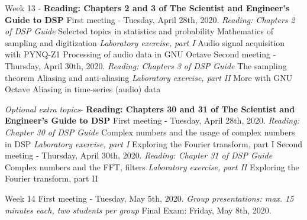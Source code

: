 \documentclass[10pt]{article}
\begin{document}
\begin{outline}[enumerate]
\1 Week 13 - \textbf{Reading: Chapters 2 and 3 of The Scientist and Engineer's Guide to DSP}
\2 First meeting - Tuesday, April 28th, 2020. \textit{Reading: Chapters 2 of DSP Guide}
\3 Selected topics in statistics and probability
\3 Mathematics of sampling and digitization
\3 \textit{Laboratory exercise, part I}
\4 Audio signal acquisition with PYNQ-Z1
\4 Processing of audio data in GNU Octave
\2 Second meeting - Thursday, April 30th, 2020. \textit{Reading: Chapters 3 of DSP Guide}
\3 The sampling theorem
\3 Aliasing and anti-aliasing
\3 \textit{Laboratory exercise, part II}
\4 More with GNU Octave
\4 Aliasing in time-series (audio) data

\1 \textit{Optional extra topics}- \textbf{Reading: Chapters 30 and 31 of The Scientist and Engineer's Guide to DSP}
\2 First meeting - Tuesday, April 28th, 2020. \textit{Reading: Chapter 30 of DSP Guide}
\3 Complex numbers and the usage of complex numbers in DSP
\3 \textit{Laboratory exercise, part I}
\4 Exploring the Fourier transform, part I
\2 Second meeting - Thursday, April 30th, 2020. \textit{Reading: Chapter 31 of DSP Guide}
\3 Complex numbers and the FFT, filters
\3 \textit{Laboratory exercise, part II}
\4 Exploring the Fourier transform, part II

\1 Week 14
\2 First meeting - Tuesday, May 5th, 2020.
\3 \textit{Group presentations: max. 15 minutes each, two students per group}
\1 Final Exam: Friday, May 8th, 2020.
\end{outline}
\end{document}
